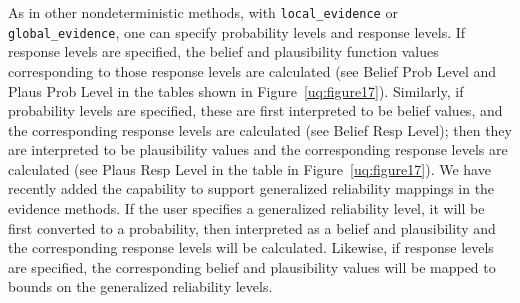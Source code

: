 As in other nondeterministic methods, with \texttt{local\_evidence}
or \texttt{global\_evidence},
one can specify probability levels and response levels. 
If response levels are specified, the belief and plausibility 
function values corresponding to those response levels are calculated 
(see Belief Prob Level and Plaus Prob Level in the tables shown in 
Figure~\ref{uq:figure17}). Similarly, if probability levels are 
specified, these are first interpreted to be belief values, and the 
corresponding response levels are calculated (see Belief Resp Level); 
then they are interpreted to be plausibility values and the 
corresponding response levels are calculated (see Plaus Resp Level in 
the table in Figure~\ref{uq:figure17}). We have recently added the 
capability to support generalized reliability mappings in 
the evidence methods. If the user specifies a generalized 
reliability level, it will be first converted to a probability, 
then interpreted as a belief and plausibility and the corresponding 
response levels will be calculated. Likewise, if response levels 
are specified, the corresponding belief and plausibility values 
will be mapped to bounds on the generalized reliability levels. 

